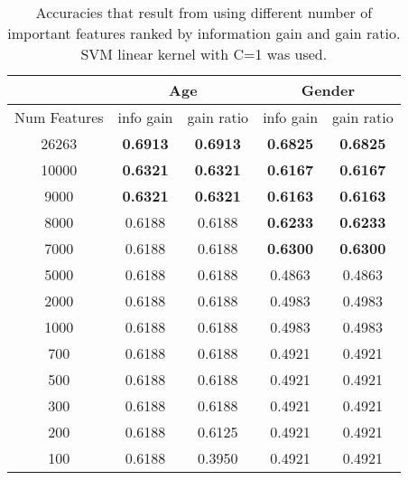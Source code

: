 \documentclass[a4paper]{llncs}
\begin{document}
\begin{table}[!htbp]
\centering
\begin{tabular}{|c|c|c|c|c|}
\hline
                                   & \multicolumn{2}{c|}{Age} & \multicolumn{2}{c|}{Gender} \\ \hline
\multicolumn{1}{|l|}{Num Features} & info gain  & gain ratio  & info gain    & gain ratio   \\ \hline
26263                              & \textbf{0.6913}     & \textbf{0.6913}      & \textbf{0.6825}       & \textbf{0.6825}       \\ \hline
10000                              & \textbf{0.6321}     & \textbf{0.6321}      & \textbf{0.6167}       & \textbf{0.6167}       \\ \hline
9000                               & \textbf{0.6321}     & \textbf{0.6321}      & \textbf{0.6163}       & \textbf{0.6163}       \\ \hline
8000                               & 0.6188     & 0.6188      & \textbf{0.6233}       & \textbf{0.6233}       \\ \hline
7000                               & 0.6188     & 0.6188      & \textbf{0.6300}       & \textbf{0.6300}       \\ \hline
5000                               & 0.6188     & 0.6188      & 0.4863       & 0.4863       \\ \hline
2000                               & 0.6188     & 0.6188      & 0.4983       & 0.4983       \\ \hline
1000                               & 0.6188     & 0.6188      & 0.4983       & 0.4983       \\ \hline
700                                & 0.6188     & 0.6188      & 0.4921       & 0.4921       \\ \hline
500                                & 0.6188     & 0.6188      & 0.4921       & 0.4921       \\ \hline
300                                & 0.6188     & 0.6188      & 0.4921       & 0.4921       \\ \hline
200                                & 0.6188     & 0.6125      & 0.4921       & 0.4921       \\ \hline
100                                & 0.6188     & 0.3950      & 0.4921       & 0.4921       \\ \hline
\end{tabular}
\caption{Accuracies that result from using different number of important features ranked by information gain and gain ratio. SVM linear kernel with C=1 was used.}
\label{table:ChoosingNumFeatures}
\end{table}
\end{document}
